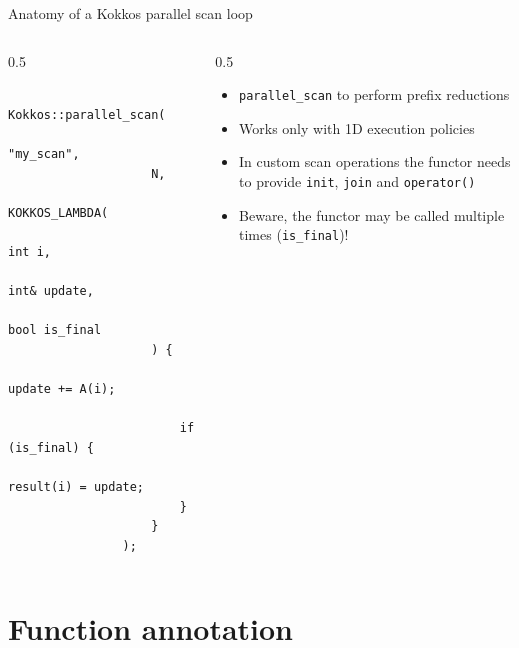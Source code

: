 \documentclass[
    aspectratio=169,
    \createHandout
]{beamer}
\begin{document}
\begin{frame}[fragile]{Anatomy of a Kokkos parallel scan loop}
    \begin{columns}
        \begin{column}{0.5\linewidth}
            \begin{verbatim}
                Kokkos::parallel_scan(
                    "my_scan",
                    N,
                    KOKKOS_LAMBDA(
                        int i,
                        int& update,
                        bool is_final
                    ) {
                        update += A(i);

                        if (is_final) {
                            result(i) = update;
                        }
                    }
                );
            \end{verbatim}
        \end{column}
        \begin{column}{0.5\linewidth}
            \begin{itemize}
                \item \texttt{parallel_scan} to perform prefix reductions
                \item Works only with 1D execution policies
                \item In custom scan operations the functor needs to provide \texttt{init}, \texttt{join} and \texttt{operator()}
                \item Beware, the functor may be called multiple times (\texttt{is\_final})!
            \end{itemize}
        \end{column}
    \end{columns}
\end{frame}

\section{Function annotation}

\end{document}
